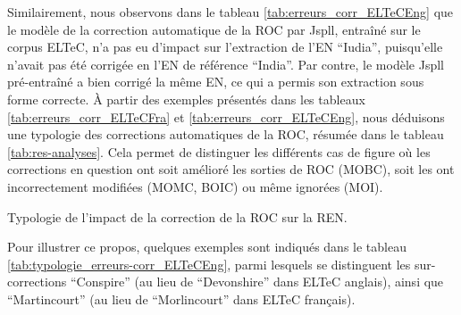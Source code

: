 Similairement, nous observons dans le tableau \ref{tab:erreurs_corr_ELTeCEng} que le modèle de la correction automatique de la ROC par Jspll, entraîné sur le corpus ELTeC, n'a pas eu d'impact sur l'extraction de l'EN ``Iudia'', puisqu'elle n'avait pas été corrigée en l'EN de référence ``India''. Par contre, le modèle Jspll pré-entraîné a bien corrigé la même EN, ce qui a permis son extraction sous forme correcte.
À partir des exemples présentés dans les tableaux \ref{tab:erreurs_corr_ELTeCFra} et \ref{tab:erreurs_corr_ELTeCEng}, nous déduisons une typologie des corrections automatiques de la ROC, résumée dans le tableau \ref{tab:res-analyses}. Cela permet de distinguer les différents cas de figure où les corrections en question ont soit amélioré les sorties de ROC (MOBC), soit les ont incorrectement modifiées (MOMC, BOIC) ou même ignorées (MOI).
\begin{table}[h!]
\scriptsize
    \centering
    
    \caption{Typologie de l'impact de la correction de la ROC sur la REN.  }
    \label{tab:res-analyses}
\end{table}

Pour illustrer ce propos, quelques exemples sont indiqués dans le tableau \ref{tab:typologie_erreurs-corr_ELTeCEng}, 
parmi lesquels se distinguent les sur-corrections ``Conspire'' 
(au lieu de ``Devonshire'' 
dans ELTeC anglais), ainsi que ``Martincourt'' (au lieu de ``Morlincourt'' dans ELTeC français).

\begin{table}[h!]
    \centering
    \scriptsize
   
    \caption{Exemples illustrant la typologie de l'impact de la correction de la ROC sur la REN pour les configurations avec \texttt{spaCy\_lg}. 
    {\normalfont Home influence}, Aguillar et {\normalfont Mon village}, Adam, \textit{small}-ELTec-\{en, fr\}.
    }
    \label{tab:typologie_erreurs-corr_ELTeCEng}
\end{table}


